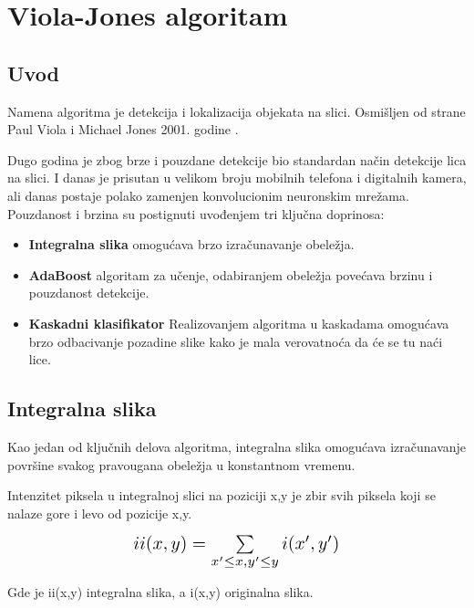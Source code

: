 \section{Viola-Jones algoritam}

\subsection{Uvod}

Namena algoritma je detekcija i lokalizacija objekata na slici. Osmišljen od
strane Paul Viola i Michael Jones 2001. godine \cite{Viola2001RapidOD}.

Dugo godina je zbog brze i pouzdane detekcije bio standardan način detekcije
lica na slici. I danas je prisutan u velikom broju mobilnih telefona i
digitalnih kamera, ali danas postaje polako zamenjen konvolucionim neuronskim
mrežama. \\

Pouzdanost i brzina su postignuti uvođenjem tri ključna doprinosa:
\begin{itemize}

\item \textbf{Integralna slika} omogućava brzo izračunavanje obeležja.
\item \textbf{AdaBoost} algoritam za učenje, odabiranjem obeležja povećava
  brzinu i pouzdanost detekcije.
\item \textbf{Kaskadni klasifikator} Realizovanjem algoritma u kaskadama
  omogućava brzo odbacivanje pozadine slike kako je mala verovatnoća da će se tu
  naći lice. \\
\end{itemize}


\subsection{Integralna slika}

Kao jedan od ključnih delova algoritma, integralna slika omogućava izračunavanje
površine svakog pravougana obeležja u konstantnom vremenu.

Intenzitet piksela u integralnoj slici na poziciji x,y je zbir svih piksela koji
se nalaze gore i levo od pozicije x,y.

\begin{equation}
  \Scale[1.4]{ii(x,y)=\sum\limits_{x'\leq x, y'\leq y} i(x',y')}
  \label{IntegralImage_eq1}
\end{equation}

Gde je ii(x,y) integralna slika, a i(x,y) originalna slika. \\

